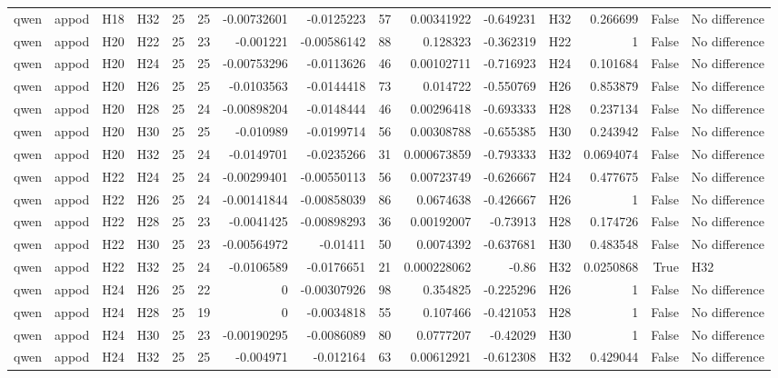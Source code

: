 \begin{longtable}{llllrrrrrrrlrrl}
qwen & appod & H18 & H32 & 25 & 25 & -0.00732601 & -0.0125223 & 57 & 0.00341922 & -0.649231 & H32 & 0.266699 & False & No difference \\
qwen & appod & H20 & H22 & 25 & 23 & -0.001221 & -0.00586142 & 88 & 0.128323 & -0.362319 & H22 & 1 & False & No difference \\
qwen & appod & H20 & H24 & 25 & 25 & -0.00753296 & -0.0113626 & 46 & 0.00102711 & -0.716923 & H24 & 0.101684 & False & No difference \\
qwen & appod & H20 & H26 & 25 & 25 & -0.0103563 & -0.0144418 & 73 & 0.014722 & -0.550769 & H26 & 0.853879 & False & No difference \\
qwen & appod & H20 & H28 & 25 & 24 & -0.00898204 & -0.0148444 & 46 & 0.00296418 & -0.693333 & H28 & 0.237134 & False & No difference \\
qwen & appod & H20 & H30 & 25 & 25 & -0.010989 & -0.0199714 & 56 & 0.00308788 & -0.655385 & H30 & 0.243942 & False & No difference \\
qwen & appod & H20 & H32 & 25 & 24 & -0.0149701 & -0.0235266 & 31 & 0.000673859 & -0.793333 & H32 & 0.0694074 & False & No difference \\
qwen & appod & H22 & H24 & 25 & 24 & -0.00299401 & -0.00550113 & 56 & 0.00723749 & -0.626667 & H24 & 0.477675 & False & No difference \\
qwen & appod & H22 & H26 & 25 & 24 & -0.00141844 & -0.00858039 & 86 & 0.0674638 & -0.426667 & H26 & 1 & False & No difference \\
qwen & appod & H22 & H28 & 25 & 23 & -0.0041425 & -0.00898293 & 36 & 0.00192007 & -0.73913 & H28 & 0.174726 & False & No difference \\
qwen & appod & H22 & H30 & 25 & 23 & -0.00564972 & -0.01411 & 50 & 0.0074392 & -0.637681 & H30 & 0.483548 & False & No difference \\
qwen & appod & H22 & H32 & 25 & 24 & -0.0106589 & -0.0176651 & 21 & 0.000228062 & -0.86 & H32 & 0.0250868 & True & H32 \\
qwen & appod & H24 & H26 & 25 & 22 & 0 & -0.00307926 & 98 & 0.354825 & -0.225296 & H26 & 1 & False & No difference \\
qwen & appod & H24 & H28 & 25 & 19 & 0 & -0.0034818 & 55 & 0.107466 & -0.421053 & H28 & 1 & False & No difference \\
qwen & appod & H24 & H30 & 25 & 23 & -0.00190295 & -0.0086089 & 80 & 0.0777207 & -0.42029 & H30 & 1 & False & No difference \\
qwen & appod & H24 & H32 & 25 & 25 & -0.004971 & -0.012164 & 63 & 0.00612921 & -0.612308 & H32 & 0.429044 & False & No difference \\

\end{longtable}
